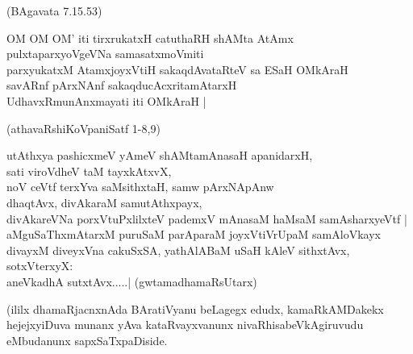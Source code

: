 \begin{itemize}
{\hfill{(BAgavata 7.15.53)}
\item[21.] OM OM OM' iti tirxrukatxH catuthaRH shAMta AtAmx\\\label{146a}
pulxtaparxyoVgeVNa samasatxmoVmiti\\
parxyukatxM AtamxjoyxVtiH sakaqdAvataRteV sa ESaH OMkAraH\\
savARnf pArxNAnf sakaqducAcxritamAtarxH \\
UdhavxRmunAnxmayati iti OMkAraH |

\hfill{(athavaRshiKoVpaniSatf 1-8,9)} 
\item[22.] utAthxya pashicxmeV yAmeV shAMtamAnasaH apanidarxH,\\\label{146b}
sati viroVdheV taM tayxkAtxvX,\\
noV ceVtf terxYva saMsithxtaH, samw pArxNApAnw\\
dhaqtAvx, divAkaraM samutAthxpayx,\\
divAkareVNa porxVtuPxlilxteV pademxV mAnasaM haMsaM samAsharxyeVtf |\\
aMguSaThxmAtarxM puruSaM parAparaM joyxVtiVrUpaM samAloVkayx\\
divayxM diveyxVna cakuSxSA, yathAlABaM uSaH kAleV sithxtAvx, sotxVterxyX:\\
aneVkadhA sutxtAvx.....|
\hfill{(gwtamadhamaRsUtarx)}}
\end{itemize}

\noindent
(ililx dhamaRjacnxnAda BAratiVyanu beLagegx edudx, kamaRkAMDakekx hejejxyiDuva munanx yAva kataRvayxvanunx nivaRhisabeVkAgiruvudu eMbudanunx sapxSaTxpaDiside. 

